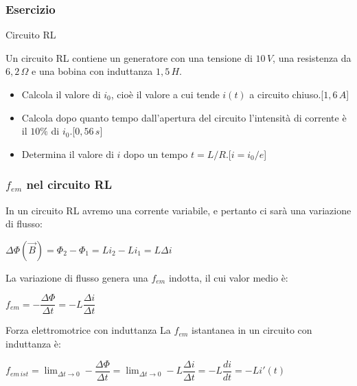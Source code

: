\documentclass[]{beamer}
\theoremstyle{plain}
\newcommand{\fem}{f_{em}}
\begin{document}
\begin{frame}
\frametitle{Esercizio}
\begin{exampleblock}{Circuito RL}
  \small{
    Un circuito RL contiene un generatore con una tensione di $ 10 \, V $, una resistenza da $ 6,2 \, \Omega $ e una bobina con induttanza $ 1,5 \, H $.

    \begin{itemize}
      \item Calcola il valore di $ i_0  $, cioè il valore a cui tende $ i(t) $ a circuito chiuso.\hspace*{\fill}[$ 1,6 \, A $]
      \item Calcola dopo quanto tempo dall'apertura del circuito l'intensità di corrente è il $ 10\% $ di $ i_0 $.\hspace*{\fill}[$ 0,56 \, s $]
      \item Determina il valore di $ i $ dopo un tempo $ t = L/R $.\hspace*{\fill}[$ i = i_0 / e $]
    \end{itemize}}
\end{exampleblock}
\end{frame}



\begin{frame}
\frametitle{$ \fem $ nel circuito RL}
In un circuito RL avremo una corrente variabile, e pertanto ci sarà una variazione di flusso:

\begin{center}
  $ \Delta \Phi(\vec{B}) = \Phi_2 - \Phi_1 = Li_2 - Li_1 = L\Delta i $\pause
\end{center}

La variazione di flusso genera una $ \fem $ indotta, il cui valor medio è:\pause
\begin{center}
$ \fem = - \dfrac{\Delta\Phi}{\Delta t} = -L \dfrac{\Delta i}{\Delta t} $\pause
\end{center}
\begin{block}{Forza elettromotrice con induttanza}
La $ \fem $ istantanea in un circuito con induttanza è:
\begin{center}
  \colorbox{blue!30}{$ \displaystyle f_{em \, ist} = \lim_{\Delta t \rightarrow 0} - \dfrac{\Delta\Phi}{\Delta t} = \lim_{\Delta t \rightarrow 0} -L \dfrac{\Delta i}{\Delta t} = - L \dfrac{d i}{d t} = - Li'(t)  $}
\end{center}
\end{block}  
\end{frame}
\end{document}
